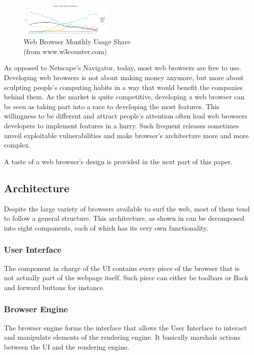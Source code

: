 \documentclass[journal]{IEEEtran}
\begin{document}
\begin{figure}[h]
\centering
\includegraphics[width=0.4\textwidth]{images/BrowserFamilyMonthlyUsageShare.png}
\caption{Web Browser Monthly Usage Share \\ (from www.w3counter.com)}
\label{fig:monthlyUsage}
\end{figure}


As opposed to Netscape's Navigator, today, most web browsers are free to use. Developing web browsers is not about making money anymore, but more about sculpting people's computing habits in a way that would benefit the companies behind them.
As the market is quite competitive, developing a web browser can be seen as taking part into a race to developing the most features. This willingness to be different and attract people's attention often lead web browsers developers to implement features in a hurry. Such frequent releases sometimes unveil exploitable vulnerabilities and make browser's architecture more and more complex.

\medskip

A taste of a web browser's design is provided in the next part of this paper.

\subsection{Architecture}

Despite the large variety of browsers available to surf the web, most of them tend to follow a general structure. This architecture, as shown in \cite{architectureWebBrowsers} \cite{howBrowsersWork} can be decomposed into eight components, each of which has its very own functionality.

\subsubsection{User Interface}
The component in charge of the UI contains every piece of the browser that is not actually part of the webpage itself. Such piece can either be toolbars or Back and forward buttons for instance.

\subsubsection{Browser Engine}
The browser engine forms the interface that allows the User Interface to interact and manipulate elements of the rendering engine. It basically marshals actions between the UI and the rendering engine.
\end{document}
